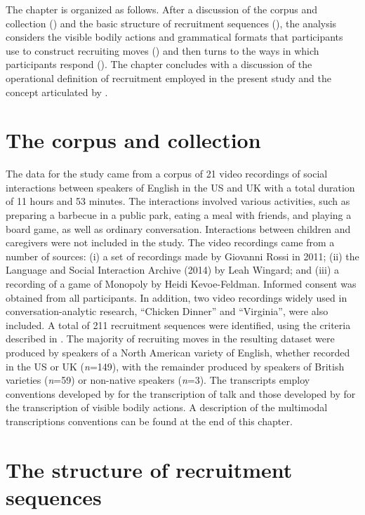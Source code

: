 \documentclass[output=paper,nonflat,modfont,draft]{langsci/langscibook}
\begin{document}
The chapter is organized as follows. After a discussion of the corpus and collection () and the basic structure of recruitment sequences (), the analysis considers the visible bodily actions and grammatical formats that participants use to construct recruiting moves () and then turns to the ways in which participants respond (). The chapter concludes with a discussion of the operational definition of recruitment employed in the present study and the concept articulated by \citet{KendrickDrew2016}.

\section{The corpus and collection}
\label{sec:kendrick:2}
The data for the study came from a corpus of 21 video recordings of social interactions between speakers of English in the US and UK with a total duration of 11 hours and 53 minutes. The interactions involved various activities, such as preparing a barbecue in a public park, eating a meal with friends, and playing a board game, as well as ordinary conversation. Interactions between children and caregivers were not included in the study. The video recordings came from a number of sources: (i) a set of recordings made by Giovanni Rossi in 2011; (ii) the Language and Social Interaction Archive (2014) by Leah Wingard; and (iii) a recording of a game of Monopoly by Heidi Kevoe-Feldman. Informed consent was obtained from all participants. In addition, two video recordings widely used in conversation-analytic research, “Chicken Dinner” and “Virginia”, were also included. A total of 211 recruitment sequences were identified, using the criteria described in . The majority of recruiting moves in the resulting dataset were produced by speakers of a North American variety of English, whether recorded in the US or UK (\textit{n}=149), with the remainder produced by speakers of British varieties (\textit{n}=59) or non-native speakers (\textit{n}=3). The transcripts employ conventions developed by \citet{jefferson_glossary_2004} for the transcription of talk and those developed by \citet{Mondada2014c} for the transcription of visible bodily actions. A description of the multimodal transcriptions conventions can be found at the end of this chapter.

\section{The structure of recruitment sequences}
\label{sec:kendrick:3}
\end{document}
